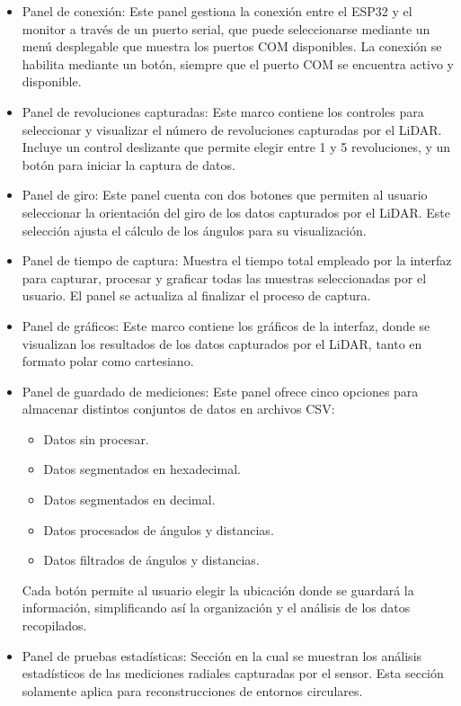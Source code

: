 \begin{itemize}
	\item  Panel de conexión: Este panel gestiona la conexión entre el ESP32 y el monitor a través de un puerto serial, que puede seleccionarse mediante un menú desplegable que muestra los puertos COM disponibles. La conexión se habilita mediante un botón, siempre que el puerto COM se encuentra activo y disponible. 
	\item Panel de revoluciones capturadas: Este marco contiene los controles para seleccionar y visualizar el número de revoluciones capturadas por el LiDAR. Incluye un control deslizante que permite elegir entre 1 y 5 revoluciones, y un botón para iniciar la captura de datos.
	\item Panel de giro: Este panel cuenta con dos botones que permiten al usuario seleccionar la orientación del giro  de los datos capturados por el LiDAR. Este selección ajusta el cálculo de los ángulos para su visualización.
	\item Panel de tiempo de captura: Muestra el tiempo total empleado por la interfaz para capturar, procesar y graficar todas las muestras seleccionadas por el usuario. El panel se actualiza al finalizar el proceso de captura.
	\item Panel de gráficos: Este marco contiene los gráficos de la interfaz, donde se visualizan los resultados de los datos capturados por el LiDAR, tanto en formato polar como cartesiano.
	\item Panel de guardado de mediciones: Este panel ofrece cinco opciones para almacenar distintos conjuntos de datos en archivos CSV:
	\begin{itemize}
		\item Datos sin procesar.
		\item Datos segmentados en hexadecimal.
		\item Datos segmentados en decimal.
		\item Datos procesados de ángulos y distancias.
		\item Datos filtrados de ángulos y distancias. 
	\end{itemize}
	Cada botón permite al usuario elegir la ubicación donde se guardará la información, simplificando así la organización y el análisis de los datos recopilados.
	\item Panel de pruebas estadísticas: Sección en la cual se muestran los análisis estadísticos de las mediciones radiales capturadas por el sensor. Esta sección solamente aplica para reconstrucciones de entornos circulares.
\end{itemize}

